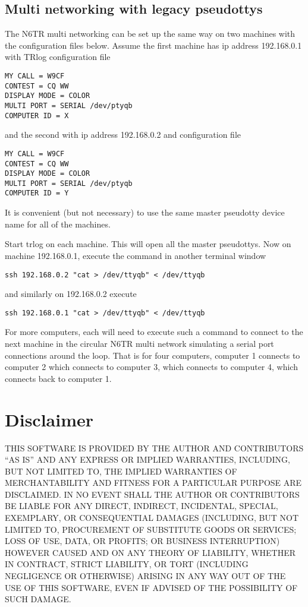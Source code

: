 \documentclass[12pt]{article}
\begin{document}
\subsection{Multi networking with legacy pseudottys}
The N6TR multi networking can be set up the same way on two machines
with the configuration files below. Assume the first machine has ip
address 192.168.0.1 with TRlog configuration file
\begin{verbatim}
MY CALL = W9CF
CONTEST = CQ WW
DISPLAY MODE = COLOR
MULTI PORT = SERIAL /dev/ptyqb
COMPUTER ID = X
\end{verbatim}
and the second with ip address 192.168.0.2 and configuration file
\begin{verbatim}
MY CALL = W9CF
CONTEST = CQ WW
DISPLAY MODE = COLOR
MULTI PORT = SERIAL /dev/ptyqb
COMPUTER ID = Y
\end{verbatim}
It is convenient (but not necessary)
to use the same master pseudotty device name for all
of the machines.

Start trlog on each machine. This will open all the master pseudottys.
Now on machine 192.168.0.1, execute the command in another terminal window
\begin{verbatim}
ssh 192.168.0.2 "cat > /dev/ttyqb" < /dev/ttyqb
\end{verbatim}
and similarly on 192.168.0.2 execute
\begin{verbatim}
ssh 192.168.0.1 "cat > /dev/ttyqb" < /dev/ttyqb
\end{verbatim}
For more computers,
each will need to execute such a command to connect to the
next machine in the circular N6TR multi network simulating a serial
port connections around the loop. That is for four computers,
computer 1 connects to computer 2
which connects to computer 3, which connects to computer 4, which connects
back to computer 1.

\section{Disclaimer}
\label{disclaim}

THIS SOFTWARE IS PROVIDED BY THE AUTHOR AND CONTRIBUTORS ``AS IS'' AND
ANY EXPRESS OR IMPLIED WARRANTIES, INCLUDING, BUT NOT LIMITED TO, THE
IMPLIED WARRANTIES OF MERCHANTABILITY AND FITNESS FOR A PARTICULAR PURPOSE
ARE DISCLAIMED.  IN NO EVENT SHALL THE AUTHOR OR CONTRIBUTORS BE LIABLE
FOR ANY DIRECT, INDIRECT, INCIDENTAL, SPECIAL, EXEMPLARY, OR CONSEQUENTIAL
DAMAGES (INCLUDING, BUT NOT LIMITED TO, PROCUREMENT OF SUBSTITUTE GOODS
OR SERVICES; LOSS OF USE, DATA, OR PROFITS; OR BUSINESS INTERRUPTION)
HOWEVER CAUSED AND ON ANY THEORY OF LIABILITY, WHETHER IN CONTRACT, STRICT
LIABILITY, OR TORT (INCLUDING NEGLIGENCE OR OTHERWISE) ARISING IN ANY WAY
OUT OF THE USE OF THIS SOFTWARE, EVEN IF ADVISED OF THE POSSIBILITY OF
SUCH DAMAGE.

\newpage
\printindex
\end{document}

